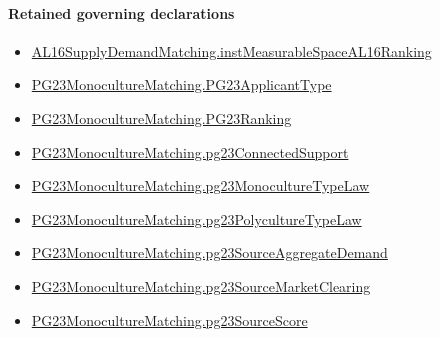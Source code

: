 \documentclass[10pt]{article}
\begin{document}
\paragraph{Retained governing declarations}
\begin{itemize}\raggedright
\item \hyperlink{governing-declaration-45aa1aca7604d942}{AL16\allowbreak{}Supply\allowbreak{}Demand\allowbreak{}Matching.\allowbreak{}inst\allowbreak{}Measurable\allowbreak{}Space\allowbreak{}AL16\allowbreak{}Ranking}
\item \hyperlink{paper-prerequisite-40ad59c353cf95ec}{PG23\allowbreak{}Monoculture\allowbreak{}Matching.\allowbreak{}PG23\allowbreak{}Applicant\allowbreak{}Type}
\item \hyperlink{paper-prerequisite-8769258a80216d15}{PG23\allowbreak{}Monoculture\allowbreak{}Matching.\allowbreak{}PG23\allowbreak{}Ranking}
\item \hyperlink{paper-prerequisite-3ea91dd17eec5e64}{PG23\allowbreak{}Monoculture\allowbreak{}Matching.\allowbreak{}pg23\allowbreak{}Connected\allowbreak{}Support}
\item \hyperlink{paper-prerequisite-e248b62a880a6917}{PG23\allowbreak{}Monoculture\allowbreak{}Matching.\allowbreak{}pg23\allowbreak{}Monoculture\allowbreak{}Type\allowbreak{}Law}
\item \hyperlink{paper-prerequisite-57a6e28ae64a74da}{PG23\allowbreak{}Monoculture\allowbreak{}Matching.\allowbreak{}pg23\allowbreak{}Polyculture\allowbreak{}Type\allowbreak{}Law}
\item \hyperlink{paper-prerequisite-3fb2e1ac28891e7d}{PG23\allowbreak{}Monoculture\allowbreak{}Matching.\allowbreak{}pg23\allowbreak{}Source\allowbreak{}Aggregate\allowbreak{}Demand}
\item \hyperlink{paper-prerequisite-55bbf5d44984bdf1}{PG23\allowbreak{}Monoculture\allowbreak{}Matching.\allowbreak{}pg23\allowbreak{}Source\allowbreak{}Market\allowbreak{}Clearing}
\item \hyperlink{paper-prerequisite-9b09ee190ab81202}{PG23\allowbreak{}Monoculture\allowbreak{}Matching.\allowbreak{}pg23\allowbreak{}Source\allowbreak{}Score}
\end{itemize}
\end{document}
